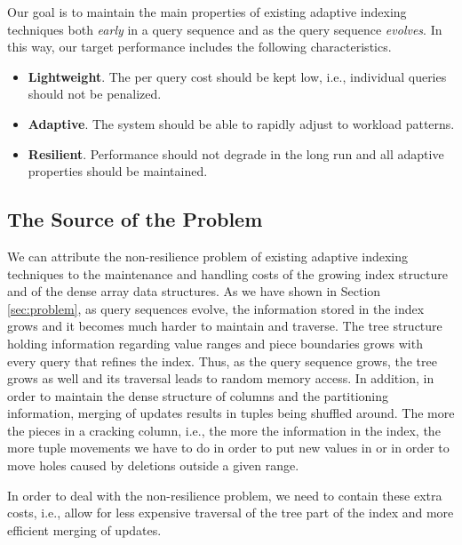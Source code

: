 Our goal is to maintain the main properties of existing adaptive indexing techniques
both {\em early} in a query sequence and as the query sequence {\em evolves}.
In this way, our target performance includes the following characteristics.
\begin{itemize}
\item \textbf{Lightweight}. The per query cost should be kept low, i.e., individual queries should not be penalized.
\vspace{-.5em}%
\item \textbf{Adaptive}. The system should be able to rapidly adjust to workload patterns.
\vspace{-.5em}%
\item \textbf{Resilient}. Performance should not degrade in the long run and all adaptive properties should be maintained.
\end{itemize}

\subsection{The Source of the Problem}

We can attribute the non-resilience problem of existing adaptive indexing techniques to
the maintenance and handling costs of the growing index structure
and of the dense array data structures.
As we have shown in Section \ref{sec:problem}, as query sequences evolve, 
the information stored in the index grows and it becomes much harder to maintain and traverse. 
The tree structure holding information regarding value ranges and piece boundaries grows with every 
query that  refines the index. Thus, as the query sequence grows, the tree grows as well and its traversal
leads to random memory access. In addition, in order to maintain the dense structure  of columns
and the partitioning information, 
merging of updates results in tuples being shuffled around.
The more the pieces in a cracking column, i.e., the more the information in the index, the more tuple
movements we have to do in order to put new values in or in order to move holes caused by deletions outside a given range.  

In order to deal with the non-resilience problem, we need to contain these extra costs, i.e., allow for
less expensive traversal of the tree part of the index and more efficient merging of updates.

